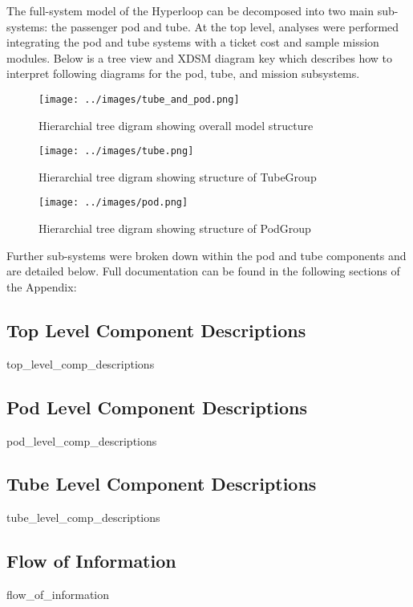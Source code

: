The full-system model of the Hyperloop can be decomposed into two main
sub-systems: the passenger pod and tube. At the top level, analyses were
performed integrating the pod and tube systems with a ticket cost  and sample
mission modules. Below is a tree view and XDSM diagram key which describes how to interpret following diagrams for the pod, tube, and mission subsystems.


\usetikzlibrary{arrows,chains,positioning,scopes,shapes.geometric,shapes.misc,shadows}
\begin{figure}
	\centering
	\label{fig:key}
\end{figure}

\begin{figure}
	\centering
	\texttt{[image: ../images/tube\_and\_pod.png]}
	\caption{Hierarchial tree digram showing overall model structure}
	\label{fig:tree:tube_and_pod}
\end{figure}

\begin{figure}
	\centering
	\texttt{[image: ../images/tube.png]}
	\caption{Hierarchial tree digram showing structure of TubeGroup}
	\label{fig:tree:tube}
\end{figure}

\begin{figure}
	\centering
	\texttt{[image: ../images/pod.png]}
	\caption{Hierarchial tree digram showing structure of PodGroup}
	\label{fig:tube}
\end{figure}

Further sub-systems were broken down within the pod and tube components and are detailed below.
Full documentation can be found in the following sections of the Appendix:

\subsection{Top Level Component Descriptions}
	{top_level_comp_descriptions}
\subsection{Pod Level Component Descriptions}
	{pod_level_comp_descriptions}
\subsection{Tube Level Component Descriptions}
	{tube_level_comp_descriptions}
\subsection{Flow of Information}
	{flow_of_information}


